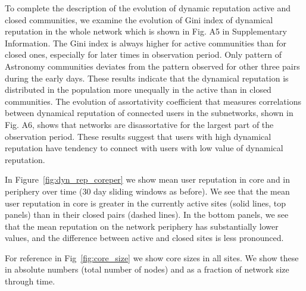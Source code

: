 To complete the description of the evolution of dynamic reputation active and closed communities, we examine the evolution of Gini index of dynamical reputation in the whole network which is shown in Fig. A5 in Supplementary Information. The Gini index is always higher for active communities than for closed ones, especially for later times in observation period. Only pattern of Astronomy communities deviates from the pattern observed for other three pairs during the early days. These results indicate that the dynamical reputation is distributed in the population more unequally in the active than in closed communities. The evolution of assortativity coefficient that measures correlations between dynamical reputation of connected users in the subnetworks, shown in Fig. A6, shows that networks are disassortative for the largest part of the observation period. These results suggest that users with high dynamical reputation have tendency to connect with users with low value of dynamical reputation. 


In Figure~\ref{fig:dyn_rep_coreper} we show mean user reputation in core and in periphery over time (30 day sliding windows as before). We see that the mean user reputation in core is greater in the currently active sites (solid lines, top panels) than in their closed pairs (dashed lines). In the bottom panels, we see that the mean reputation on the network periphery has substantially lower values, and the difference between active and closed sites is less pronounced. 

For reference in Fig~\ref{fig:core_size} we show core sizes in all sites. We show these in absolute numbers (total number of nodes) and as a fraction of network size through time.






